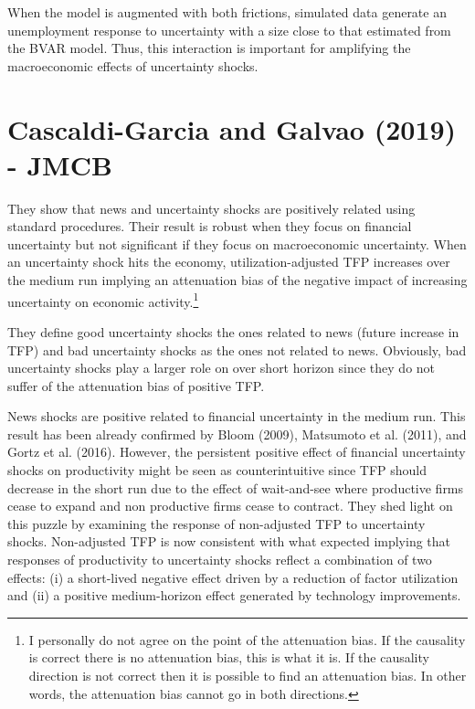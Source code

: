 \documentclass{article}
\begin{document}
{When the model is augmented with both frictions, simulated data generate an unemployment response to uncertainty with a size close to that estimated from the BVAR model. Thus, this interaction is important for amplifying the macroeconomic effects of uncertainty shocks. 



\section*{Cascaldi-Garcia and Galvao (2019) - JMCB}

They show that news and uncertainty shocks are positively related using standard procedures. Their result is robust when they focus on financial uncertainty but not significant if they focus on macroeconomic uncertainty. When an uncertainty shock hits the economy, utilization-adjusted TFP increases over the medium run implying an attenuation bias of the negative impact of increasing uncertainty on economic activity.\footnote{I personally do not agree on the point of the attenuation bias. If the causality is correct there is no attenuation bias, this is what it is. If the causality direction is not correct then it is possible to find an attenuation bias. In other words, the attenuation bias cannot go in both directions.}

They define good uncertainty shocks the ones related to news (future increase in TFP) and bad uncertainty shocks as the ones not related to news. Obviously, bad uncertainty shocks play a larger role on over short horizon since they do not suffer of the attenuation bias of positive TFP.

News shocks are positive related to financial uncertainty in the medium run. This result has been already confirmed by Bloom (2009), Matsumoto et al. (2011), and Gortz et al. (2016). However, the persistent positive effect of financial uncertainty shocks on productivity might be seen as counterintuitive since TFP should decrease in the short run due to the effect of wait-and-see where productive firms cease to expand and non productive firms cease to contract. They shed light on this puzzle by examining the response of non-adjusted TFP to uncertainty shocks. Non-adjusted TFP is now consistent with what expected implying that responses of productivity to uncertainty shocks reflect a combination of two effects: (i) a short-lived negative effect driven by a reduction of factor utilization and (ii) a positive medium-horizon effect generated by technology improvements.  

}
\end{document}
